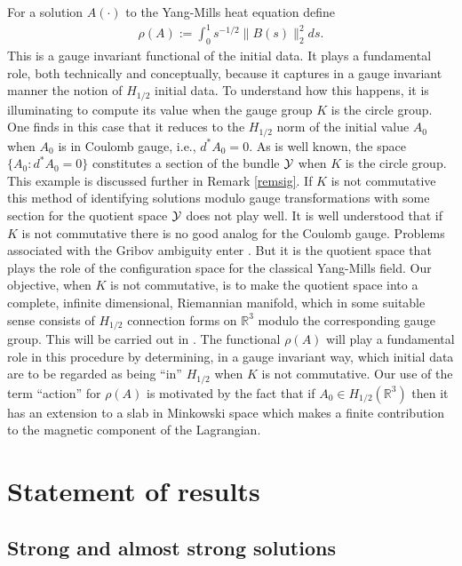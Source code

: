 \documentclass[12pt]{article}
\def \R{\mathbb R}
\def \Y{{\cal Y}}
\numberwithin{equation}{section}
\begin{document}
   For  a solution $A(\cdot)$ to the Yang-Mills heat equation define  
   \begin{align}
   \rho(A) := \int_0^1 s^{-1/2} \|B(s)\|_2^2 ds.
   \end{align}
   This is a gauge invariant functional of the initial data. It plays a fundamental role,  
   both technically and conceptually,
   because it captures in a gauge invariant manner the notion of $H_{1/2}$ initial data.
To understand how this happens, it is illuminating to compute its value when the gauge group
$K$ is the circle group.  
       One finds in this case that it reduces to the $H_{1/2}$ norm of the initial value $A_0$
       when $A_0$ is in Coulomb gauge, i.e., $d^*A_0 = 0$. As is well known, the space $\{A_0: d^*A_0 = 0\}$
       constitutes  a section of the bundle $\Y$  when $K$ is the circle group.   This example is discussed
       further in Remark \ref{remsig}.
                  If $K$ is not commutative  this method of identifying solutions modulo gauge transformations
   with some section  for the quotient space  $\Y$     does not play well. 
         It is well understood that if $K$ is not commutative 
     there is no good analog for the Coulomb gauge.
   Problems associated with the Gribov ambiguity enter  \cite{Si1, NR, Z}. 
 But it is the quotient space     that plays the role of the configuration space
   for  the classical Yang-Mills field.
    Our objective, when $K$ is not commutative, 
 is to make the quotient space into a complete, infinite dimensional,
   Riemannian manifold, which in some suitable sense consists of $H_{1/2}$ connection forms
   on $\R^3$ modulo the corresponding  gauge group. This will be carried out in \cite{G72}.
   The 
   functional $\rho(A)$ will play a fundamental
   role in this procedure  by determining, in a gauge invariant way, 
   which  initial data are  to be regarded as being 
   ``in''  $H_{1/2}$ when $K$ is not commutative. 
   Our use of  the term ``action'' for  $\rho(A)$   is motivated by the
   fact that  if $A_0 \in H_{1/2}(\R^3)$ then it has an extension to a slab 
   in Minkowski space which makes a finite contribution to the magnetic component of the Lagrangian.
   
  

   
\section{Statement of results}    \label{secstate}
    


\subsection{Strong and almost strong solutions}
\end{document}
